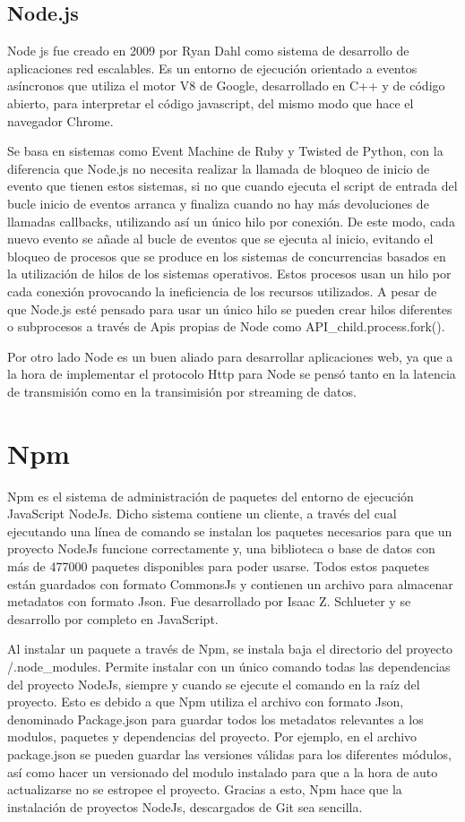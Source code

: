 \documentclass[a4paper, 12pt]{book}
\begin{document}
\subsection{Node.js} 
\label{sec:Node.js}
Node js fue creado en 2009 por Ryan Dahl como sistema de desarrollo de aplicaciones red escalables. Es un entorno de ejecución orientado a eventos asíncronos que utiliza el motor V8 de Google, desarrollado en C++ y de código abierto, para interpretar el código javascript, del mismo modo que hace el navegador Chrome. 

Se basa en sistemas como Event Machine de Ruby y Twisted de Python, con la diferencia que Node.js no necesita realizar la llamada de bloqueo de inicio de evento que tienen estos sistemas, si no que cuando ejecuta el script de entrada del bucle inicio de eventos arranca y finaliza cuando no hay más devoluciones de llamadas callbacks, utilizando así un único hilo por conexión. De este modo, cada nuevo evento se añade al bucle de eventos que se ejecuta al inicio, evitando el bloqueo de procesos que se produce en los sistemas de concurrencias basados en la utilización de hilos de los sistemas operativos. Estos procesos usan un hilo por cada conexión provocando la ineficiencia de los recursos utilizados. A pesar de que Node.js esté pensado para usar un único hilo se pueden crear hilos diferentes o subprocesos a través de Apis propias de Node como API_child.process.fork(). 

Por otro lado Node es un buen aliado para desarrollar aplicaciones web, ya que a la hora de implementar el protocolo Http para Node se pensó tanto en la latencia de transmisión como en la transimisión por streaming de datos. 

\section{Npm} 
\label{sec:Npm}
Npm es el sistema de administración de paquetes del entorno de ejecución JavaScript NodeJs. Dicho sistema contiene un cliente, a través del cual ejecutando una línea de comando se instalan los paquetes necesarios para que un proyecto NodeJs funcione correctamente y, una biblioteca o base de datos con más de 477000 paquetes disponibles para poder usarse. Todos estos paquetes están guardados con formato CommonsJs y contienen un archivo para almacenar metadatos con formato Json. Fue desarrollado por Isaac Z. Schlueter y se desarrollo por completo en JavaScript.

Al instalar un paquete a través de Npm, se instala baja el directorio del proyecto \slash .node\_modules. Permite instalar con un único comando todas las dependencias del proyecto NodeJs, siempre y cuando se ejecute el comando en la raíz del proyecto. Esto es debido a que Npm utiliza el archivo con formato Json, denominado Package.json para guardar todos los metadatos relevantes a los modulos, paquetes y dependencias del proyecto. Por ejemplo, en el archivo package.json se pueden guardar las versiones válidas para los diferentes módulos, así como hacer un versionado del modulo instalado para que a la hora de auto actualizarse no se estropee el proyecto. Gracias a esto, Npm hace que la instalación de proyectos NodeJs, descargados de Git sea sencilla.
\end{document}
